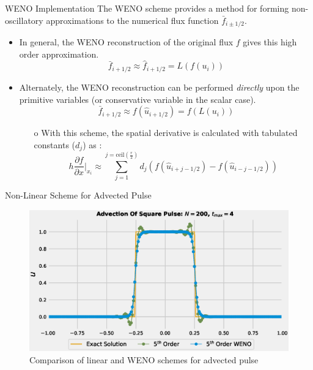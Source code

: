 \documentclass[9pt]{beamer}
\begin{document}
\begin{frame}{WENO Implementation}
  The WENO scheme provides a method for forming non-oscillatory approximations to the numerical flux function $\bar{f}_{i\pm 1/2}$. 
\begin{itemize}
  \item In general, the WENO reconstruction of the original flux $f$ gives this high order approximation.
  $$\bar{f}_{i+1/2} \approx \hat{f}_{i+1/2} = L(f(u_i))$$
  \item Alternately, the WENO reconstruction can be performed \textit{directly} upon the primitive variables (or conservative variable in the scalar case).
  $$\bar{f}_{i+1/2} \approx f(\hat{u}_{i+1/2}) = f(L(u_i))$$
  \begin{itemize}
    \item[o] With this scheme, the spatial derivative is calculated with tabulated constants ($d_j$) as \cite{Shahbazi}:
    $$	h\frac{\partial f}{\partial x}\bigg|_{x_i}\approx \sum_{j=1}^{j=\text{ceil}(\tfrac{r}{2})}d_j(f(\hat{u}_{i+j-1/2})-f(\hat{u}_{i-j-1/2}))$$
  \end{itemize}
\end{itemize}
\end{frame}

\begin{frame}{Non-Linear Scheme for Advected Pulse}
  \begin{figure}[H]
    \centering
    \includegraphics[scale=0.45]{AdvectionHighOrderComparison_pulseWENO.eps}\caption{Comparison of linear and WENO schemes for advected pulse}
    \end{figure}
\end{frame}
\end{document}
